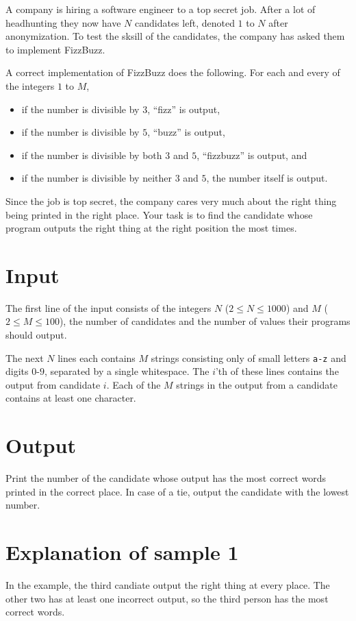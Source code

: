 A company is hiring a software engineer to a top secret job.
After a lot of headhunting they now have $N$ candidates left, denoted $1$ to $N$ after anonymization.
To test the sksill of the candidates, the company has asked them to implement FizzBuzz.

A correct implementation of FizzBuzz does the following.
For each and every of the integers $1$ to $M$,
\begin{itemize}
  \item if the number is divisible by $3$, ``fizz'' is output,
  \item if the number is divisible by $5$, ``buzz'' is output,
  \item if the number is divisible by both $3$ and $5$, ``fizzbuzz'' is output, and
  \item if the number is divisible by neither $3$ and $5$, the number itself is output.
\end{itemize}

Since the job is top secret, the company cares very much about the right thing being printed in the right place.
Your task is to find the candidate whose program outputs the right thing at the right position the most times.

\section*{Input}
The first line of the input consists of the integers $N$ ($2 \leq N \leq 1000$) and $M$ ($2 \leq M \leq 100$), the number of candidates and the number of values their programs should output.

The next $N$ lines each contains $M$ strings consisting only of small letters \texttt{a-z} and digits $0$-$9$, separated by a single whitespace.
The $i$'th of these lines contains the output from candidate $i$.
Each of the $M$ strings in the output from a candidate contains at least one character.

\section*{Output}
Print the number of the candidate whose output has the most correct words printed in the correct place.
In case of a tie, output the candidate with the lowest number.

\section*{Explanation of sample 1}
In the example, the third candiate output the right thing at every place.
The other two has at least one incorrect output, so the third person has the most correct words.
